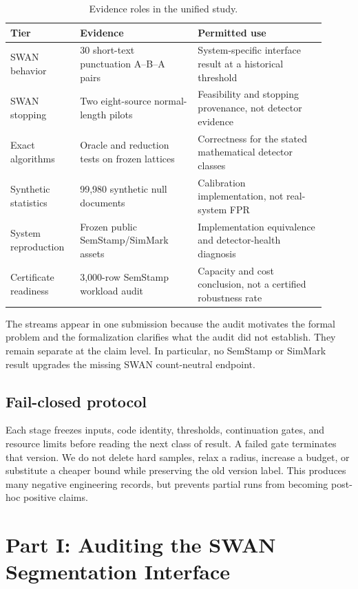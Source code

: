 \documentclass[10pt]{article}
\begin{document}
\begin{table}[t]
\caption{Evidence roles in the unified study.}
\label{tab:evidence}
\centering
\small
\begin{tabular}{p{0.20\linewidth}p{0.34\linewidth}p{0.37\linewidth}}
\toprule
Tier & Evidence & Permitted use \\
\midrule
SWAN behavior & 30 short-text punctuation A--B--A pairs &
System-specific interface result at a historical threshold \\
SWAN stopping & Two eight-source normal-length pilots &
Feasibility and stopping provenance, not detector evidence \\
Exact algorithms & Oracle and reduction tests on frozen lattices &
Correctness for the stated mathematical detector classes \\
Synthetic statistics & 99,980 synthetic null documents &
Calibration implementation, not real-system FPR \\
System reproduction & Frozen public SemStamp/SimMark assets &
Implementation equivalence and detector-health diagnosis \\
Certificate readiness & 3,000-row SemStamp workload audit &
Capacity and cost conclusion, not a certified robustness rate \\
\bottomrule
\end{tabular}
\end{table}

The streams appear in one submission because the audit motivates the formal
problem and the formalization clarifies what the audit did not establish.
They remain separate at the claim level. In particular, no SemStamp or
SimMark result upgrades the missing SWAN count-neutral endpoint.

\subsection{Fail-closed protocol}

Each stage freezes inputs, code identity, thresholds, continuation gates, and
resource limits before reading the next class of result. A failed gate
terminates that version. We do not delete hard samples, relax a radius,
increase a budget, or substitute a cheaper bound while preserving the old
version label. This produces many negative engineering records, but prevents
partial runs from becoming post-hoc positive claims.

\section{Part I: Auditing the SWAN Segmentation Interface}
\end{document}
